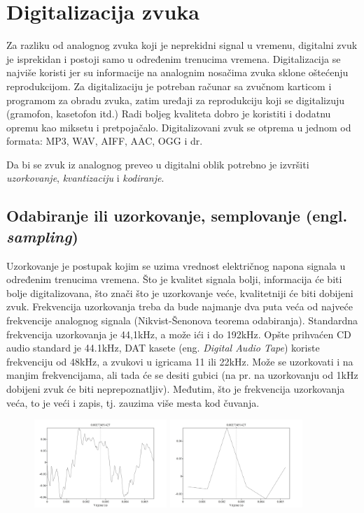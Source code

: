 \documentclass[11pt]{article}
\begin{document}
\section{Digitalizacija zvuka}
Za razliku od analognog zvuka koji je neprekidni signal u vremenu, digitalni zvuk je isprekidan i postoji samo u određenim trenucima vremena. Digitalizacija se najviše koristi jer su informacije na analognim nosačima zvuka sklone oštećenju reprodukcijom. Za digitalizaciju je potreban računar sa zvučnom karticom i programom za obradu zvuka, zatim uređaji za reprodukciju koji se digitalizuju (gramofon, kasetofon itd.) Radi boljeg kvaliteta dobro je koristiti i dodatnu opremu kao miksetu i pretpojačalo. Digitalizovani zvuk se otprema u jednom od formata: MP3, WAV, AIFF, AAC, OGG i dr.

Da bi se zvuk iz analognog preveo u digitalni oblik potrebno je izvršiti \textit{uzorkovanje}, \textit{kvantizaciju} i \textit{kodiranje}.

\subsection{Odabiranje ili uzorkovanje, semplovanje (engl. \textit{sampling})}
Uzorkovanje je postupak kojim se uzima vrednost električnog napona signala u određenim trenucima vremena. Što je kvalitet signala bolji, informacija će biti bolje digitalizovana, što znači što je uzorkovanje veće, kvalitetniji će biti dobijeni zvuk. Frekvencija uzorkovanja treba da bude najmanje dva puta veća od najveće frekvencije analognog signala (Nikvist-Šenonova teorema odabiranja). Standardna frekvencija uzorkovanja je 44,1kHz, a može ići i do 192kHz. Opšte prihvaćen CD audio standard je 44.1kHz, DAT kasete (eng. \textit{Digital Audio Tape}) koriste frekvenciju od 48kHz, a zvukovi u igricama 11 ili 22kHz. Može se uzorkovati i na manjim frekvencijama, ali tada će se desiti gubici (na pr. na uzorkovanju od 1kHz dobijeni zvuk će biti neprepoznatljiv). Međutim, što je frekvencija uzorkovanja veća, to je veći i zapis, tj. zauzima više mesta kod čuvanja.

\begin{figure}[!h]
    \centering
    \includegraphics[width=5cm]{Uzorkovanje1}
    \label{fig:Uzorkovanje 44,1kHz}
    \includegraphics[width=5cm]{Uzorkovanje2}
    \label{fig:Uzorkovanje 1kHz}
\end{figure}
\end{document}
